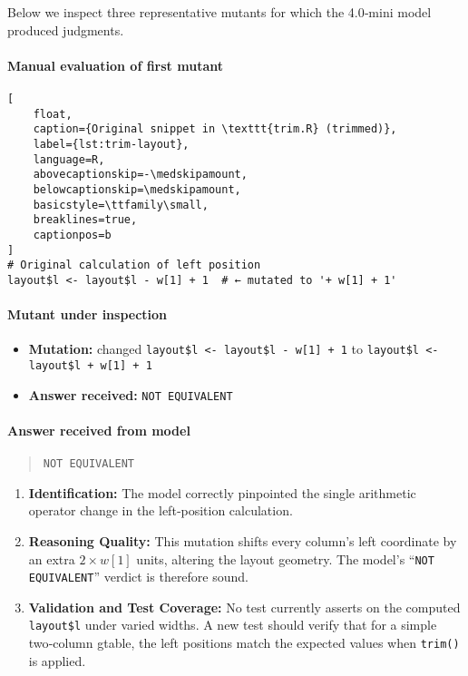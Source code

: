 Below we inspect three representative mutants for which the 4.0‐mini model produced judgments.

\paragraph{Manual evaluation of first mutant}
\begin{lstlisting}[
    float,
    caption={Original snippet in \texttt{trim.R} (trimmed)},
    label={lst:trim-layout},
    language=R,
    abovecaptionskip=-\medskipamount,
    belowcaptionskip=\medskipamount,
    basicstyle=\ttfamily\small,
    breaklines=true,
    captionpos=b
]
# Original calculation of left position
layout$l <- layout$l - w[1] + 1  # ← mutated to '+ w[1] + 1'
\end{lstlisting}

\paragraph{Mutant under inspection}
\begin{itemize}
  \item \textbf{Mutation:} changed  
    \texttt{layout\$l <- layout\$l - w[1] + 1}  
    to  
    \texttt{layout\$l <- layout\$l + w[1] + 1}
  \item \textbf{Answer received:} \texttt{NOT EQUIVALENT}
\end{itemize}

\paragraph{Answer received from model}
\begin{quote}
\texttt{NOT EQUIVALENT}
\end{quote}

\begin{enumerate}
  \item \textbf{Identification:}  
    The model correctly pinpointed the single arithmetic operator change in the left‐position calculation.

  \item \textbf{Reasoning Quality:}  
    This mutation shifts every column’s left coordinate by an extra \(2\times w[1]\) units, altering the layout geometry. The model’s “\texttt{NOT EQUIVALENT}” verdict is therefore sound.

  \item \textbf{Validation and Test Coverage:}  
    No test currently asserts on the computed \texttt{layout\$l} under varied widths. A new test should verify that for a simple two‐column gtable, the left positions match the expected values when \texttt{trim()} is applied.
\end{enumerate}

